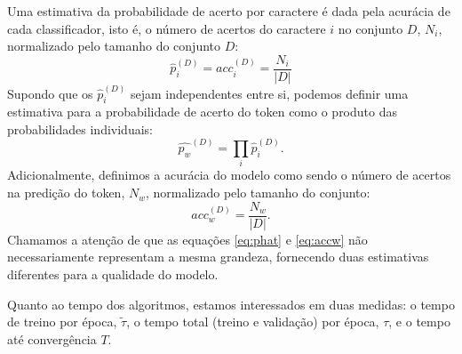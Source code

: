Uma estimativa da probabilidade de acerto por caractere é dada pela acurácia de cada classificador, isto é, o número de acertos do caractere $i$ no conjunto $D$, $N_i$, normalizado pelo tamanho do conjunto $D$: 
\begin{equation}
	\hat{p}_i^{(D)} = acc_i^{(D)} = \frac{N_i}{|D|}
\end{equation}
Supondo que os $\hat{p}_i^{(D)}$ sejam independentes entre si, podemos definir uma estimativa para a probabilidade de acerto do token como o produto das probabilidades individuais:
\begin{equation} \label{eq:phat}
	\hat{p_w}^{(D)} = \prod_{i} \hat{p}_i^{(D)}.
\end{equation}
Adicionalmente, definimos a acurácia do modelo como sendo o número de acertos na predição do token, $N_w$, normalizado pelo tamanho do conjunto:
\begin{equation} \label{eq:accw}
	acc_w^{(D)} = \frac{N_w}{|D|}.
\end{equation}
Chamamos a atenção de que as equações \ref{eq:phat} e \ref{eq:accw} não necessariamente representam a mesma grandeza, fornecendo duas estimativas diferentes para a qualidade do modelo.

Quanto ao tempo dos algoritmos, estamos interessados em duas medidas: o tempo de treino por época, $\tilde{\tau}$, o tempo total (treino e validação) por época, $\tau$, e o tempo até convergência $T$.